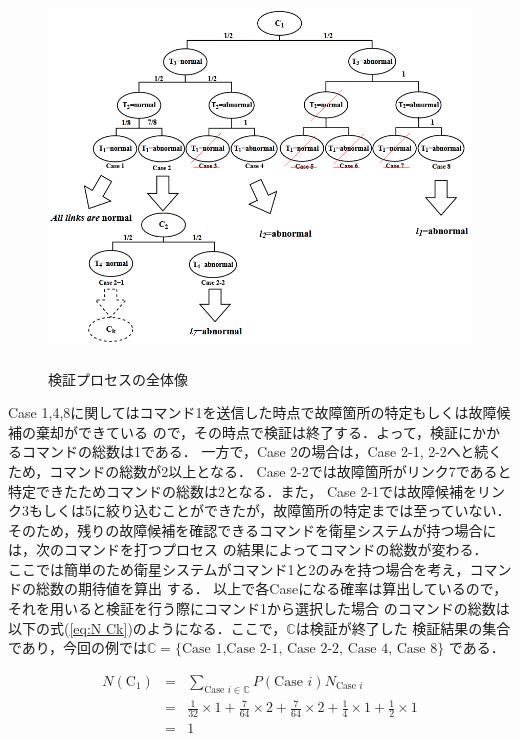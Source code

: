 \documentclass[11pt]{jsreport}
\begin{document}
\begin{figure}[H]
   \centering
      \includegraphics[height=10.0cm]{figure/all_process.png}
      \caption{検証プロセスの全体像}
      \label{fig:all_process}
\end{figure}
Case 1,4,8に関してはコマンド1を送信した時点で故障箇所の特定もしくは故障候補の棄却ができている
ので，その時点で検証は終了する．よって，検証にかかるコマンドの総数は1である．
一方で，Case 2の場合は，Case 2-1, 2-2へと続くため，コマンドの総数が2以上となる．
Case 2-2では故障箇所がリンク7であると特定できたためコマンドの総数は2となる．また，
Case 2-1では故障候補をリンク3もしくは5に絞り込むことができたが，故障箇所の特定までは至っていない．
そのため，残りの故障候補を確認できるコマンドを衛星システムが持つ場合には，次のコマンドを打つプロセス
の結果によってコマンドの総数が変わる．\\
ここでは簡単のため衛星システムがコマンド1と2のみを持つ場合を考え，コマンドの総数の期待値を算出
する．
以上で各Caseになる確率は算出しているので，それを用いると検証を行う際にコマンド1から選択した場合
のコマンドの総数は以下の式(\ref{eq:N Ck})のようになる．ここで，$\mathbb{C}$は検証が終了した
検証結果の集合であり，今回の例では$\mathbb{C} = \{\text{Case 1,Case 2-1, Case 2-2, Case 4, Case 8}\}$
である．

\begin{eqnarray}
   N(\text{C}_1) &=& \sum_{\text{Case }i\in\mathbb{C}} P(\text{Case }i) N_{\text{Case }i} \nonumber \\
     &=& \frac{1}{32}\times 1 + \frac{7}{64}\times 2 + \frac{7}{64}\times 2 + \frac{1}{4}\times 1 +
     \frac{1}{2}\times 1 \nonumber \\
     &=& 1 \label{eq:N Ck}
\end{eqnarray}
\end{document}
